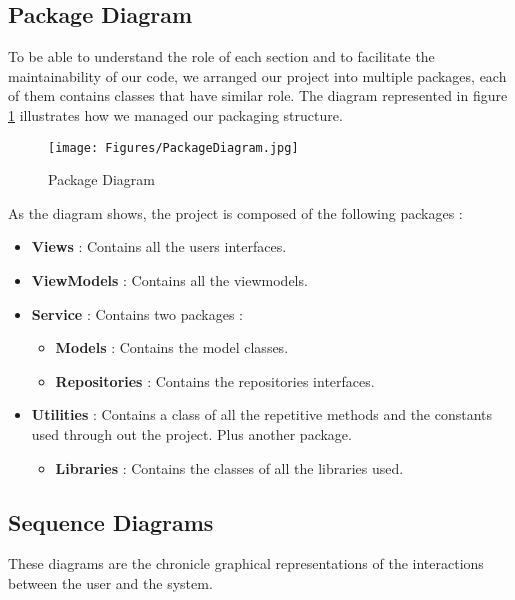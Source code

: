\subsection{Package Diagram}
To be able to understand the role of each section and to facilitate the maintainability of our code, we arranged our project into multiple packages, each of them contains classes that have similar role. The diagram represented in figure \ref{fig:packaging} illustrates how we managed our packaging structure.
\begin{figure}[H]
\centering
\texttt{[image: Figures/PackageDiagram.jpg]}
\caption{Package Diagram}
\label{fig:packaging}
\end{figure}
As the diagram shows, the project is composed of the following packages :
\begin{itemize}
    \item \textbf{Views} : Contains all the users interfaces.
    \item \textbf{ViewModels} : Contains all the viewmodels.
    \item \textbf{Service} : Contains two packages : 
    \begin{itemize}
        \item \textbf{Models} : Contains the model classes.
        \item \textbf{Repositories} : Contains the repositories interfaces.
    \end{itemize}
    \item \textbf{Utilities} : Contains a class of all the repetitive methods and the constants used through out the project. Plus another package.
    \begin{itemize}
        \item \textbf{Libraries} : Contains the classes of all the libraries used.
    \end{itemize}
\end{itemize}
\subsection{Sequence Diagrams} 
These diagrams are the chronicle graphical representations of the interactions between the user and the system.
